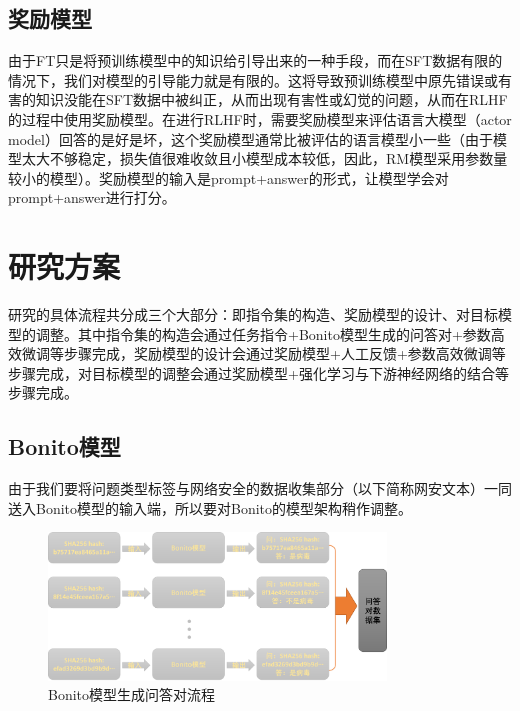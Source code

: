 \subsection{奖励模型}
由于FT只是将预训练模型中的知识给引导出来的一种手段，而在SFT数据有限的情况下，我们对模型的引导能力就是有限的。这将导致预训练模型中原先错误或有害的知识没能在SFT数据中被纠正，从而出现有害性或幻觉\cite{Ye2023CognitiveMA}的问题，从而在RLHF的过程中使用奖励模型。在进行RLHF时，需要奖励模型来评估语言大模型（actor model）回答的是好是坏，这个奖励模型通常比被评估的语言模型小一些（由于模型太大不够稳定，损失值很难收敛且小模型成本较低，因此，RM模型采用参数量较小的模型）。奖励模型的输入是prompt+answer的形式，让模型学会对prompt+answer进行打分。

\section{研究方案}
研究的具体流程共分成三个大部分：即指令集的构造、奖励模型的设计、对目标模型的调整。其中指令集的构造会通过任务指令+Bonito模型生成的问答对+参数高效微调等步骤完成，奖励模型的设计会通过奖励模型+人工反馈+参数高效微调等步骤完成，对目标模型的调整会通过奖励模型+强化学习与下游神经网络的结合等步骤完成。

\subsection{Bonito模型}
由于我们要将问题类型标签与网络安全的数据收集部分（以下简称网安文本）一同送入Bonito模型的输入端，所以要对Bonito的模型架构稍作调整。
\begin{figure}[htbp]
    \centering
    \includegraphics[width=0.8\textwidth]{./img/prompt.png}
    \caption{Bonito模型生成问答对流程}\label{fig:bonito}
\end{figure}

